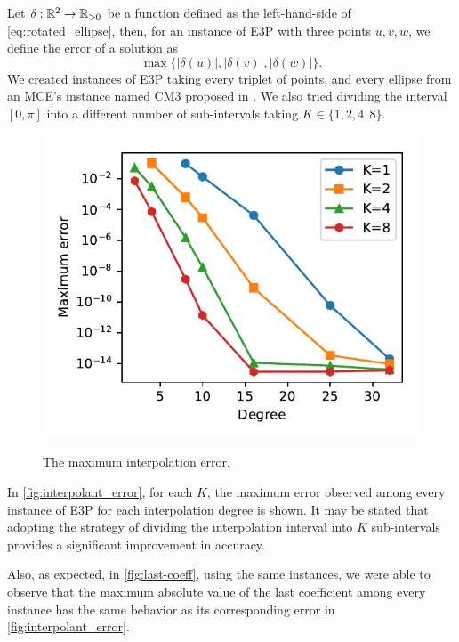 Let $\delta : \mathbb{R}^2 \to \mathbb{R}_{>0}$ be a function defined as the left-hand-side of \autoref{eq:rotated_ellipse}, then, for an instance of E3P with three points $u, v, w$, we define the error of a solution as $$\max\{|\delta(u)|, |\delta(v)|, |\delta(w)| \}.$$
We created instances of E3P taking every triplet of points, and every ellipse from an MCE's instance named CM3 proposed in . We also tried dividing the interval $[0, \pi]$ into a different number of sub-intervals taking $K \in\{1, 2, 4, 8\}$.

\begin{figure}
	\centering
	\caption{The maximum interpolation error.}
	\includegraphics[scale=.9]{tex/figures/error_roots}
	\fautor
	\label{fig:interpolant_error}
\end{figure}

In \autoref{fig:interpolant_error}, for each $K$, the maximum error observed among every instance of E3P for each interpolation degree is shown. It may be stated that adopting the strategy of dividing the interpolation interval into $K$ sub-intervals provides a significant improvement in accuracy.

Also, as expected, in \autoref{fig:last-coeff}, using the same instances, we were able to observe that the maximum absolute value of the last coefficient among every instance has the same behavior as its corresponding error in \autoref{fig:interpolant_error}.

